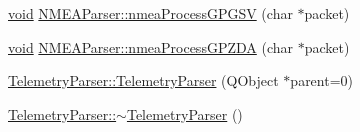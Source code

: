 \begin{DoxyCompactItemize}
\item 
\hyperlink{group___u_a_v_objects_plugin_ga444cf2ff3f0ecbe028adce838d373f5c}{void} \hyperlink{group___g_p_s_gadget_plugin_ga35b60b2a2f0643fd5202557a5aaace81}{N\-M\-E\-A\-Parser\-::nmea\-Process\-G\-P\-G\-S\-V} (char $\ast$packet)
\item 
\hyperlink{group___u_a_v_objects_plugin_ga444cf2ff3f0ecbe028adce838d373f5c}{void} \hyperlink{group___g_p_s_gadget_plugin_ga01e0952dc227b7f7d3cef2d36f684544}{N\-M\-E\-A\-Parser\-::nmea\-Process\-G\-P\-Z\-D\-A} (char $\ast$packet)
\item 
\hyperlink{group___g_p_s_gadget_plugin_ga0a989a67079a7e06f5034415c751b46c}{Telemetry\-Parser\-::\-Telemetry\-Parser} (Q\-Object $\ast$parent=0)
\item 
\hyperlink{group___g_p_s_gadget_plugin_ga9a05a4fb6f18cdc568bc4e8f52534977}{Telemetry\-Parser\-::$\sim$\-Telemetry\-Parser} ()
\end{DoxyCompactItemize}
